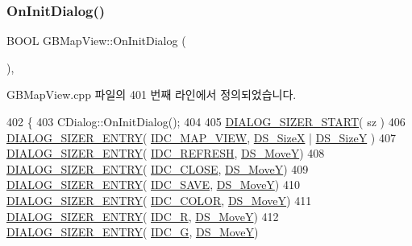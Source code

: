 \subsubsection{\texorpdfstring{On\+Init\+Dialog()}{OnInitDialog()}}
{\footnotesize\ttfamily B\+O\+OL G\+B\+Map\+View\+::\+On\+Init\+Dialog (\begin{DoxyParamCaption}{ }\end{DoxyParamCaption})\hspace{0.3cm}{\ttfamily [protected]}, {\ttfamily [virtual]}}



G\+B\+Map\+View.\+cpp 파일의 401 번째 라인에서 정의되었습니다.


\begin{DoxyCode}
402 \{
403   CDialog::OnInitDialog();
404   
405   \mbox{\hyperlink{_resize_dlg_8h_acb9d1d22d9838f6dda8a61cfa132997c}{DIALOG\_SIZER\_START}}( sz )
406     \mbox{\hyperlink{_resize_dlg_8h_a0e9ee7a18c54003893895a009f5d79c8}{DIALOG\_SIZER\_ENTRY}}( \mbox{\hyperlink{resource_8h_a3e6bb424d55ccf9fed6fa557eba35488}{IDC\_MAP\_VIEW}}, \mbox{\hyperlink{_resize_dlg_8h_a21713fd373c62604a1ee3d5d831101ad}{DS\_SizeX}} | 
      \mbox{\hyperlink{_resize_dlg_8h_a783821ba6bb984916d55f46cdf90cb2b}{DS\_SizeY}} )
407     \mbox{\hyperlink{_resize_dlg_8h_a0e9ee7a18c54003893895a009f5d79c8}{DIALOG\_SIZER\_ENTRY}}( \mbox{\hyperlink{resource_8h_ab2f366ad34063a7be9de1e2249dc705a}{IDC\_REFRESH}}, \mbox{\hyperlink{_resize_dlg_8h_ae5309071be822a4dae5cb33a131f6180}{DS\_MoveY}})
408     \mbox{\hyperlink{_resize_dlg_8h_a0e9ee7a18c54003893895a009f5d79c8}{DIALOG\_SIZER\_ENTRY}}( \mbox{\hyperlink{resource_8h_a27e7224faecfa4040c695a69107088f9}{IDC\_CLOSE}}, \mbox{\hyperlink{_resize_dlg_8h_ae5309071be822a4dae5cb33a131f6180}{DS\_MoveY}})
409     \mbox{\hyperlink{_resize_dlg_8h_a0e9ee7a18c54003893895a009f5d79c8}{DIALOG\_SIZER\_ENTRY}}( \mbox{\hyperlink{resource_8h_a305f8d6fb810f32b99a97396ac92f9d5}{IDC\_SAVE}},  \mbox{\hyperlink{_resize_dlg_8h_ae5309071be822a4dae5cb33a131f6180}{DS\_MoveY}})
410     \mbox{\hyperlink{_resize_dlg_8h_a0e9ee7a18c54003893895a009f5d79c8}{DIALOG\_SIZER\_ENTRY}}( \mbox{\hyperlink{resource_8h_a611975b03b6d7ce68b2de260b97086d0}{IDC\_COLOR}}, \mbox{\hyperlink{_resize_dlg_8h_ae5309071be822a4dae5cb33a131f6180}{DS\_MoveY}})
411     \mbox{\hyperlink{_resize_dlg_8h_a0e9ee7a18c54003893895a009f5d79c8}{DIALOG\_SIZER\_ENTRY}}( \mbox{\hyperlink{resource_8h_ab801af70383175ec71fd14d356bf9c9d}{IDC\_R}}, \mbox{\hyperlink{_resize_dlg_8h_ae5309071be822a4dae5cb33a131f6180}{DS\_MoveY}})
412     \mbox{\hyperlink{_resize_dlg_8h_a0e9ee7a18c54003893895a009f5d79c8}{DIALOG\_SIZER\_ENTRY}}( \mbox{\hyperlink{resource_8h_a35ca279082796c6a98895939aa06826d}{IDC\_G}}, \mbox{\hyperlink{_resize_dlg_8h_ae5309071be822a4dae5cb33a131f6180}{DS\_MoveY}})

\end{DoxyCode}
